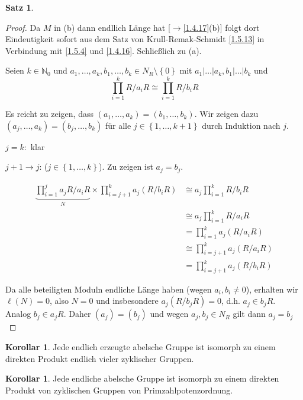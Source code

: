 \documentclass[
twoside=semi,
fontsize=12,
DIV=12, 
cleardoublepage=current,
leqno,
headings=optiontoheadandtoc, 
toc=idx
]{scrbook}
\newcommand{\N}{\mathbb{N}}
\newcommand{\set}[1]{\left\{ #1 \right\}}
\theoremstyle{definition}
\newtheorem{satz}[definition]{Satz}
\newtheorem{korollar}[definition]{Korollar}
\begin{document}
\begin{satz}
\begin{proof}
			Da $M$ in (b) dann endllich L\"ange hat [$\to$\ref{1.4.17}(b)] folgt dort Eindeutigkeit sofort aus dem Satz von Krull-Remak-Schmidt \ref{1.5.13} in Verbindung mit \ref{1.5.4} und \ref{1.4.16}. Schlie\ss lich zu (a).
			
			Seien $k \in \N_0$ und $a_1, \dots, a_k, b_1, \dots, b_k \in N_R \setminus \set{0}$ mit $a_1|\dots|a_k, b_1|\dots|b_k$ und 
				\[\prod_{i=1}^k R/a_iR \cong \prod_{i=1}^kR/b_iR\]
				
			Es reicht zu zeigen, dass $(a_1, \dots, a_k) = (b_1, \dots, b_k)$. Wir zeigen dazu $(a_j, \dots, a_k) = (b_j, \dots, b_k)$ f\"ur alle $j\in \set{1,\dots,k+1}$ durch Induktion nach $j$.
			
			$j=k:$ klar
			
			$j+1\to j$: ($j \in \set{1,\dots,k}$). Zu zeigen ist $a_j = b_j$. 
			
			\begin{align*}
				\underbrace{\prod_{i=1}^j a_jR/a_iR}_{N} \times \prod_{i=j+1}^k a_j(R/b_iR) &\cong a_j \prod_{i=1}^k R/b_iR\\
				&\cong a_j \prod_{i=1}^k R/a_iR\\
				&=\prod_{i=1}^k a_j(R/a_iR)\\
				&\cong \prod_{i=j+1}^k a_j(R/a_iR)\\
				&= \prod_{i=j+1}^k a_j(R/b_iR)
			\end{align*} 
		
			Da alle beteiligten Moduln endliche L\"ange haben (wegen $a_i, b_i \neq 0$), erhalten wir $\ell(N) = 0$, also $N=0$ und insbesondere $a_j(R/b_jR) = 0$, d.h. $a_j \in b_jR$. Analog $b_j \in a_jR$. Daher $(a_j) = (b_j)$ und wegen $a_j, b_j \in N_R$ gilt dann $a_j = b_j$
		\end{proof}
	\end{satz}

	\begin{korollar}\label{1.6.10}
		Jede endlich erzeugte abelsche Gruppe ist isomorph zu einem direkten Produkt endlich vieler zyklischer Gruppen.
	\end{korollar}

	\begin{korollar}\label{1.6.11}
		Jede endliche abelsche Gruppe ist isomorph zu einem direkten Produkt von zyklischen Gruppen von Primzahlpotenzordnung.
	\end{korollar}
\end{document}
